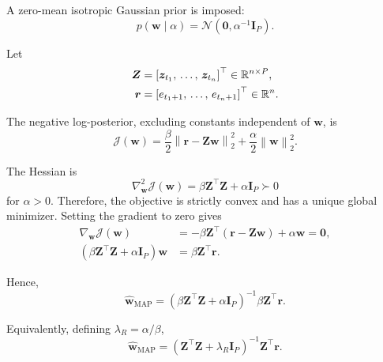 \documentclass[review,number,sort&compress]{elsarticle}
\begin{document}
A zero-mean isotropic Gaussian prior is imposed:
\begin{equation}
    p(\bm{w}\mid\alpha)
    =
    \mathcal{N}
    \left(
    \bm{0},
    \alpha^{-1}\bm{I}_{P}
    \right).
    \label{eq:ridge_prior}
\end{equation}

Let
\begin{align}
    \bm{Z}
    &=
    \left[
    \bm{z}_{t_1},\,
    \ldots,\,
    \bm{z}_{t_n}
    \right]^\top
    \in
    \mathbb{R}^{n\times P},
    \\
    \bm{r}
    &=
    \left[
    e_{t_1+1},\,
    \ldots,\,
    e_{t_n+1}
    \right]^\top
    \in
    \mathbb{R}^n.
\end{align}

The negative log-posterior, excluding constants independent of $\bm{w}$, is
\begin{equation}
    \mathcal{J}(\bm{w})
    =
    \frac{\beta}{2}
    \left\|
    \bm{r}-\bm{Z}\bm{w}
    \right\|_2^2
    +
    \frac{\alpha}{2}
    \left\|
    \bm{w}
    \right\|_2^2.
    \label{eq:ridge_objective}
\end{equation}

The Hessian is
\begin{equation}
    \nabla_{\bm{w}}^2
    \mathcal{J}(\bm{w})
    =
    \beta\bm{Z}^\top\bm{Z}
    +
    \alpha\bm{I}_{P}
    \succ0
\end{equation}
for $\alpha>0$. Therefore, the objective is strictly convex and has a unique
global minimizer.
Setting the gradient to zero gives
\begin{align}
    \nabla_{\bm{w}}\mathcal{J}(\bm{w})
    &=
    -\beta\bm{Z}^\top
    \left(
    \bm{r}-\bm{Z}\bm{w}
    \right)
    +
    \alpha\bm{w}
    =
    \bm{0},
    \\
    \left(
    \beta\bm{Z}^\top\bm{Z}
    +
    \alpha\bm{I}_{P}
    \right)\bm{w}
    &=
    \beta\bm{Z}^\top\bm{r}.
\end{align}

Hence,
\begin{equation}
    \widehat{\bm{w}}_{\mathrm{MAP}}
    =
    \left(
    \beta\bm{Z}^\top\bm{Z}
    +
    \alpha\bm{I}_{P}
    \right)^{-1}
    \beta\bm{Z}^\top\bm{r}.
    \label{eq:ridge_closed_form}
\end{equation}

Equivalently, defining $\lambda_R=\alpha/\beta$,
\begin{equation}
    \widehat{\bm{w}}_{\mathrm{MAP}}
    =
    \left(
    \bm{Z}^\top\bm{Z}
    +
    \lambda_R\bm{I}_{P}
    \right)^{-1}
    \bm{Z}^\top\bm{r}.
\end{equation}
\end{document}

